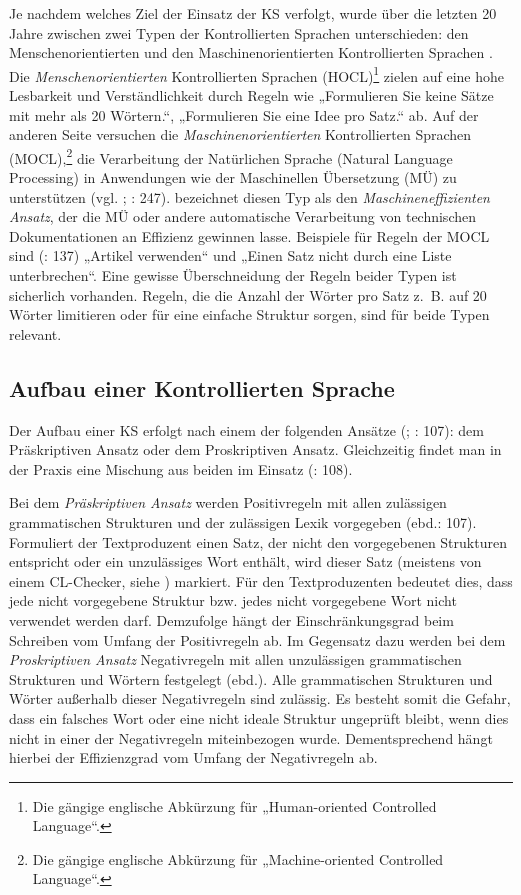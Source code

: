 Je nachdem welches Ziel der Einsatz der KS verfolgt, wurde über die letzten 20 Jahre zwischen zwei Typen der Kontrollierten Sprachen unterschieden: den Menschenorientierten und den Maschinenorientierten Kontrollierten Sprachen \citep{Huijsen1998}. Die \textit{Menschenorientierten} Kontrollierten Sprachen (HOCL)\footnote{{{{Die gängige englische Abkürzung für „Human-oriented Controlled Language“.}}}} zielen auf eine hohe Lesbarkeit und Verständlichkeit durch Regeln wie „Formulieren Sie keine Sätze mit mehr als 20 Wörtern.“, „Formulieren Sie eine Idee pro Satz.“ ab. Auf der anderen Seite versuchen die \textit{Maschinenorientierten} Kontrollierten Sprachen (MOCL),\footnote{{{{Die gängige englische Abkürzung für „Machine-oriented Controlled Language“.}}}} die Verarbeitung der Natürlichen Sprache (Natural Language Processing) in Anwendungen wie der Maschinellen Übersetzung (MÜ) zu unterstützen (vgl. \citealt{Huijsen1998}; \citealt{NybergEtAl2003}: 247). \citet[13f.]{Lehrndorfer1996a} bezeichnet diesen Typ als den \textit{Maschineneffizienten Ansatz}, der die MÜ oder andere automatische Verarbeitung von technischen Dokumentationen an Effizienz gewinnen lasse. Beispiele für Regeln der MOCL sind (\citealt{tekom2013}: 137) „Artikel verwenden“ und „Einen Satz nicht durch eine Liste unterbrechen“. Eine gewisse Überschneidung der Regeln beider Typen ist sicherlich vorhanden. Regeln, die die Anzahl der Wörter pro Satz z.~B. auf 20 Wörter limitieren oder für eine einfache Struktur sorgen, sind für beide Typen relevant.

\subsection{Aufbau einer Kontrollierten Sprache}
\label{sec:2.1.3}
Der Aufbau einer KS erfolgt nach einem der folgenden Ansätze (\citealt{Reuther2007}; \citealt{LehrndorferReuther2008}: 107): dem Präskriptiven Ansatz oder dem Proskriptiven Ansatz. Gleichzeitig findet man in der Praxis eine Mischung aus beiden im Einsatz (\citealt{LehrndorferReuther2008}: 108).

Bei dem \textit{Präskriptiven Ansatz} werden Positivregeln mit allen zulässigen grammatischen Strukturen und der zulässigen Lexik vorgegeben (ebd.: 107). Formuliert der Textproduzent einen Satz, der nicht den vorgegebenen Strukturen entspricht oder ein unzulässiges Wort enthält, wird dieser Satz (meistens von einem CL-Checker, siehe ) markiert. Für den Textproduzenten bedeutet dies, dass jede nicht vorgegebene Struktur bzw. jedes nicht vorgegebene Wort nicht verwendet werden darf. Demzufolge hängt der Einschränkungsgrad beim Schreiben vom Umfang der Positivregeln ab. Im Gegensatz dazu werden bei dem \textit{Proskriptiven Ansatz} Negativregeln mit allen unzulässigen grammatischen Strukturen und Wörtern festgelegt (ebd.). Alle grammatischen Strukturen und Wörter außerhalb dieser Negativregeln sind zulässig. Es besteht somit die Gefahr, dass ein falsches Wort oder eine nicht ideale Struktur ungeprüft bleibt, wenn dies nicht in einer der Negativregeln miteinbezogen wurde. Dementsprechend hängt hierbei der Effizienzgrad vom Umfang der Negativregeln ab.

